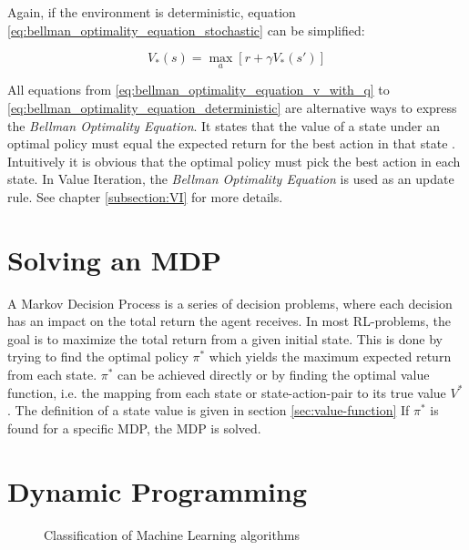 Again, if the environment is deterministic, equation \ref{eq:bellman_optimality_equation_stochastic} can be simplified:

\begin{equation}
V_*(s) = \max_a[r+\gamma V_*(s')]
\label{eq:bellman_optimality_equation_deterministic}
\end{equation}

All equations from \ref{eq:bellman_optimality_equation_v_with_q} to \ref{eq:bellman_optimality_equation_deterministic} are alternative ways to express the \textit{Bellman Optimality Equation}. It states that the value of a state under an optimal policy must equal the expected return for the best action in that state \cite{SuttonBarto2018}. Intuitively it is obvious that the optimal policy must pick the best action in each state. In Value Iteration, the \textit{Bellman Optimality Equation} is used as an update rule. See chapter \ref{subsection:VI} for more details.

\section{Solving an MDP}

A Markov Decision Process is a series of decision problems, where each decision has an impact on the total return the agent receives. In most RL-problems, the goal is to maximize the total return from a given initial state. This is done by trying to find the optimal policy $\pi^*$ which yields the maximum expected return from each state. $\pi^*$ can be achieved directly or by finding the optimal value function, i.e. the mapping from each state or state-action-pair to its true value $V^*$. The definition of a state value is given in section \ref{sec:value-function} If $\pi^*$ is found for a specific MDP, the MDP is solved.

\section{Dynamic Programming}
\label{chapter3}

\begin{figure}[h]
	\centering
	\caption{Classification of Machine Learning algorithms}
	\label{fig:classification_ml} 
\end{figure}

